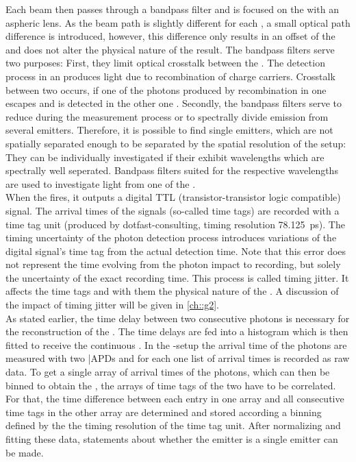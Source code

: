 		Each beam then passes through a bandpass filter and is focused on the \apd with an aspheric lens.
		As the beam path is slightly different for each \APD, a small optical path difference is introduced, however, this difference only results in an offset of the \gtf and does not alter the physical nature of the result.
		The bandpass filters serve two purposes:
		First, they limit optical crosstalk between the \apds.
		The detection process in an \apd produces light due to recombination of charge carriers.
		Crosstalk between two \apds occurs, if one of the photons produced by recombination in one \apd escapes and is detected in the other one \cite{Younger2009}.
		Secondly, the bandpass filters serve to reduce \bkg during the \gt measurement process or to spectrally divide emission from several emitters.
		Therefore, it is possible to find single emitters, which are not spatially separated enough to be separated by the spatial resolution of the setup:
		They can be individually investigated if their \ZPLs exhibit wavelengths which are spectrally well seperated.
		Bandpass filters suited for the respective wavelengths are used to investigate light from one of the \ZPLs.
		\\
		When the \APD fires, it outputs a digital TTL (transistor-transistor logic compatible) signal.
		The arrival times of the signals (so-called time tags) are recorded with a time tag unit (produced by dotfast-consulting, timing resolution \SI{78.125}{\pico\second}).
		The timing uncertainty of the photon detection process introduces variations of the digital signal's time tag from the actual detection time.
		Note that this error does not represent the time evolving from the photon impact to recording, but solely the uncertainty of the exact recording time.
		This process is called timing jitter.
		It affects the time tags and with them the physical nature of the \gtf.
		A discussion of the impact of timing jitter will be given in \autoref{ch::g2}. 
		\\
		As stated earlier, the time delay between two consecutive photons is necessary for the reconstruction of the \gtf.
		The time delays are fed into a histogram which is then fitted to receive the continuous \gtf.
		In the \HBT{}-setup the arrival time of the photons are measured with two |APDs and for each \APD one list of arrival times is recorded as raw data.
		To get a single array of arrival times of the photons, which can then be binned to obtain the \gtf, the arrays of time tags of the two \APDs have to be correlated.
		For that, the time difference between each entry in one array and all consecutive time tags in the other array are determined and stored according a binning defined by the the timing resolution of the time tag unit.
		After normalizing and fitting these data, statements about whether the emitter is a single emitter can be made.
